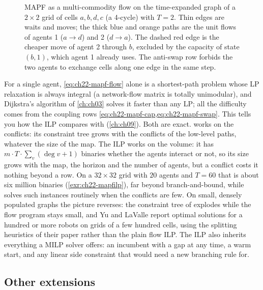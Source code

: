 \begin{figure}[tb]
  \centering
  \caption{MAPF as a multi-commodity flow on the time-expanded graph of a
  $2 \times 2$ grid of cells $a, b, d, c$ (a 4-cycle) with $T = 2$. Thin
  edges are waits and moves; the thick blue and orange paths are the unit
  flows of agents 1 ($a \to d$) and 2 ($d \to a$). The dashed red edge is
  the cheaper move of agent 2 through $b$, excluded by the capacity of
  state $(b, 1)$, which agent 1 already uses. The anti-swap row forbids
  the two agents to exchange cells along one edge in the same step.}
  \label{fig:ch22-timeexpanded}
\end{figure}

For a single agent, \cref{eq:ch22-mapf-flow} alone is a shortest-path
problem whose LP relaxation is always integral (a network-flow matrix is
totally unimodular), and Dijkstra's algorithm of \cref{ch:ch03} solves it
faster than any LP; all the difficulty comes from the coupling rows
\cref{eq:ch22-mapf-cap,eq:ch22-mapf-swap}. This tells you how the ILP
compares with \cbs (\cref{ch:ch09}). Both are exact. \cbs works on the
conflicts: its constraint tree grows with the conflicts of the low-level
paths, whatever the size of the map. The ILP works on the volume: it has $m \cdot T \cdot \sum_v (\deg v + 1)$
binaries whether the agents interact or not, so its size grows with the
map, the horizon and the number of agents, but a conflict costs it nothing
beyond a row. On a $32 \times 32$ grid with $20$ agents and $T = 60$ that
is about six million binaries (\cref{exr:ch22-mapfilp}), far beyond
branch-and-bound, while \cbs solves such instances routinely when the
conflicts are few. On small, densely populated graphs the picture reverses:
the constraint tree of \cbs explodes while the flow program stays small,
and Yu and LaValle report optimal solutions for a hundred or more robots on
grids of a few hundred cells, using the splitting heuristics of their paper
rather than the plain flow ILP. The ILP also inherits everything a MILP
solver offers: an incumbent with a gap at any time, a warm start, and any
linear side constraint that \cbs would need a new branching rule for.

\subsection{Other extensions}
\label{sec:ch22-other}


